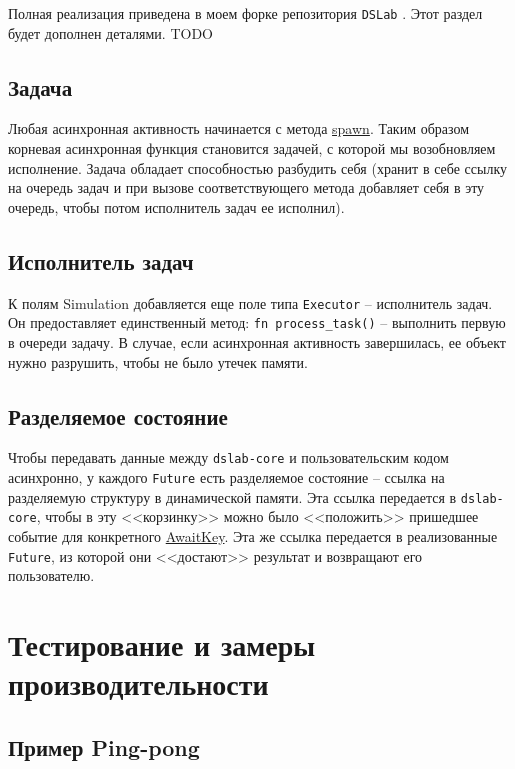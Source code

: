 Полная реализация приведена в моем форке репозитория \texttt{DSLab} \cite{async-dslab-core}. Этот раздел будет дополнен деталями. TODO 

\subsection{Задача}

Любая асинхронная активность начинается с метода \hyperref[spawn]{spawn}. Таким образом корневая асинхронная функция становится задачей, с которой мы возобновляем исполнение. Задача обладает способностью разбудить себя (хранит в себе ссылку на очередь задач и при вызове соответствующего метода добавляет себя в эту очередь, чтобы потом исполнитель задач ее исполнил).

\subsection{Исполнитель задач}

К полям Simulation добавляется еще поле типа \texttt{Executor} -- исполнитель задач. Он предоставляет единственный метод: \texttt{fn process\_task()} -- выполнить первую в очереди задачу. В случае, если асинхронная активность завершилась, ее объект нужно разрушить, чтобы не было утечек памяти.

\subsection{Разделяемое состояние}

Чтобы передавать данные между \texttt{dslab-core} и пользовательским кодом асинхронно, у каждого \texttt{Future} есть разделяемое состояние -- ссылка на разделяемую структуру в динамической памяти. Эта ссылка передается в \texttt{dslab-core}, чтобы в эту <<корзинку>> можно было <<положить>> пришедшее событие для конкретного \hyperref[awaitkey]{AwaitKey}. Эта же ссылка передается в реализованные \texttt{Future}, из которой они <<достают>> результат и возвращают его пользователю. 

\section{Тестирование и замеры производительности} \label{async-testing}

\subsection{Пример Ping-pong}

